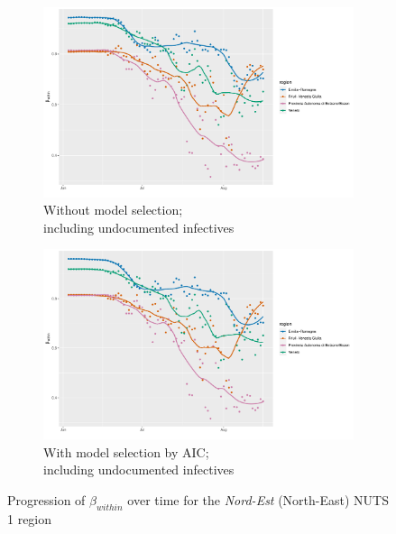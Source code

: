 \documentclass[12pt]{article}
\begin{document}
    \begin{figure}[H]\ContinuedFloat
	    \begin{subfigure}{\textwidth}
	      \centering
	      \includegraphics[width=0.95\linewidth]{output/model1_lag3_betawithin_Nord-Est_UndocQuadratic_rolling.pdf}
	      \caption{Without model selection; \\ including undocumented infectives}
	      \label{fig:beta_within_over_time_nordest_regular_undoc}
	    \end{subfigure}\newline
	    \begin{subfigure}{\textwidth}
	      \centering
	      \includegraphics[width=0.95\linewidth]{output/model1_lag3_betawithin_Nord-Est_aic_UndocQuadratic_rolling.pdf}
	      \caption{With model selection by AIC; \\ including undocumented infectives}
	      \label{fig:beta_within_over_time_nordest_aic_undoc}
	    \end{subfigure}
	    \caption{Progression of $\beta_{within}$ over time for the \textit{Nord-Est} (North-East) NUTS 1 region}
	    \label{fig:beta_within_over_time_nordest}
    \end{figure}
	
\end{document}
